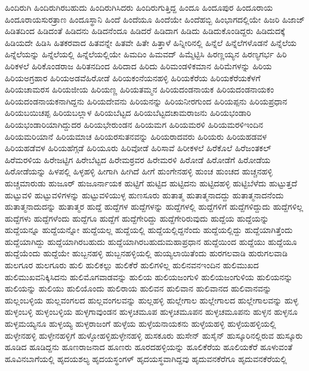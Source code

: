 {ಹಿಂದಿರುಗಿ
ಹಿಂದಿರುಗಿರಬಹುದು
ಹಿಂದಿರುಗಿಸಿದರು
ಹಿಂದಿರುಗುತ್ತಿದ್ದ
ಹಿಂದೂ
ಹಿಂದೂಪುರ
ಹಿಂದೂರಾಯ
ಹಿಂದೂರಾಯಸುರತ್ರಾಣ
ಹಿಂದೂಸ್ಥಾನಿ
ಹಿಂದೆ
ಹಿಂದೆಯೂ
ಹಿಂದೆಯೇ
ಹಿಂದೆಹಬ್ಬಿ
ಹಿಂಭಾಗದಲ್ಲಿಯೇ
ಹಿಜರಿ
ಹಿಜಾಜ್
ಹಿಡಿತದಿಂದ
ಹಿಡಿದಂತೆ
ಹಿಡಿದನು
ಹಿಡಿದನೆಂದೂ
ಹಿಡಿದರೆ
ಹಿಡಿದಾಗ
ಹಿಡಿದು
ಹಿಡಿದುಕೊಂಡಿದ್ದರು
ಹಿಡಿದುದಕ್ಕೆ
ಹಿಡಿಯದೇ
ಹಿಡಿಸಿ
ಹಿತಕರವಾದ
ಹಿತವನ್ನೇ
ಹಿತವೇ
ಹಿತೇ
ಹಿತ್ತಾಳೆ
ಹಿನ್ನೀರಿನಲ್ಲಿ
ಹಿನ್ನೆಲೆ
ಹಿನ್ನೆಲೆಗಳೊಡನೆ
ಹಿನ್ನೆಲೆಯ
ಹಿನ್ನೆಲೆಯನ್ನು
ಹಿನ್ನೆಲೆಯಲ್ಲಿ
ಹಿನ್ನೆಲೆಯಲ್ಲಿಯೇ
ಹಿಮದಿಂ
ಹಿಮವದ್
ಹಿಮ್ಮೆಟ್ಟಿಸಿ
ಹಿರಣ್ಣಯ್ಯನ
ಹಿರಣ್ಯಗರ್ಭ
ಹಿರಿ
ಹಿರಿಕಳಲೆ
ಹಿರಿಕೊಂಡರಾಜ
ಹಿರಿತನದಿಂದ
ಹಿರಿದಾದ
ಹಿರಿದು
ಹಿರಿಮಂಡಳಿಕಮಾನ
ಹಿರಿಮೆಗಳನ್ನು
ಹಿರಿಯ
ಹಿರಿಯಅಗ್ರಹಾರ
ಹಿರಿಯಅಡವೆಹಿರೋಡೆ
ಹಿರಿಯಕಂನೆಯನಹಳ್ಳಿ
ಹಿರಿಯಕೆರೆಯ
ಹಿರಿಯಕೆರೆಯಕೆಳಗೆ
ಹಿರಿಯಚಾಮರಸ
ಹಿರಿಯಜೀಯ
ಹಿರಿಯಣ್ಣ
ಹಿರಿಯತಮ್ಮನ
ಹಿರಿಯದಂಡನಾಯಕ
ಹಿರಿಯದಂಡನಾಯಕಂ
ಹಿರಿಯದಂಡನಾಯಕನಾಗಿದ್ದನು
ಹಿರಿಯದೇವನು
ಹಿರಿಯನನ್ನು
ಹಿರಿಯನೀರಗುಂದ
ಹಿರಿಯಪ್ಪನು
ಹಿರಿಯಪ್ರಧಾನ
ಹಿರಿಯಬಯಿಚಪ್ಪ
ಹಿರಿಯಬಲ್ಲಾಳ
ಹಿರಿಯಬೆಟ್ಟದ
ಹಿರಿಯಬೆಟ್ಟದಚಾಮರಾಜನು
ಹಿರಿಯಭಂಡಾರಿ
ಹಿರಿಯಭಂಡಾರಿಯಾಗಿದ್ದುದರ
ಹಿರಿಯಭೇರುಂಡನ
ಹಿರಿಯಮಗ
ಹಿರಿಯಮರಳಿ
ಹಿರಿಯಮರಳಿಇಂದಿನ
ಹಿರಿಯಮರಿಯಾನೆ
ಹಿರಿಯಮಾಚ
ಹಿರಿಯರಸುತನವನ್ನು
ಹಿರಿಯರಾದವರು
ಹಿರಿಯರು
ಹಿರಿಯಹಡವಳ
ಹಿರಿಯಹಡೆವಳ
ಹಿರಿಯಹೆಗ್ಗಡೆ
ಹಿರಿಯೂರು
ಹಿರಿವೋಡೆ
ಹಿರಿಸಾವೆ
ಹಿರೀಕಳಲೆ
ಹಿರೆಕೊಲೆ
ಹಿರೆಜಂತಕಲ್
ಹಿರೆಮರಳಿಯ
ಹಿರೇಜಟ್ಟಿಗ
ಹಿರೇಬೆಟ್ಟದ
ಹಿರೇಮಠ್ರವರ
ಹಿರೇಮರಳಿ
ಹಿರೋಡೆ
ಹಿರೋಡೆಗೆ
ಹಿರೋಡೆಯ
ಹಿರೋಡೆಯನ್ನು
ಹಿಳಪಲ್ಲಿ
ಹಿಳ್ಳಹಳ್ಳಿ
ಹೀಗಾಗಿ
ಹೀಗಿದೆ
ಹೀಗೆ
ಹುಂಗೇನಹಳ್ಳಿ
ಹುಂಚ
ಹುಂಚದ
ಹುಚ್ಚನಹಳ್ಳಿ
ಹುಚ್ಚಮಾರುಡು
ಹುಜೂರ್
ಹುಜೂರ್ನಾಯಕ
ಹುಟ್ಟಿಗೆ
ಹುಟ್ಟಿದ
ಹುಟ್ಟಿದನು
ಹುಟ್ಟಿದಹಳ್ಳಿ
ಹುಟ್ಟಿಬೆಳೆದು
ಹುಟ್ಟುತ್ತದೆ
ಹುಟ್ಟುವಳಿ
ಹುಟ್ಟುವಳಿಗಳನ್ನು
ಹುಟ್ಟುವಳಿಯುಳ್ಳ
ಹುಣಸೂರು
ಹುತಾತ್ಮ
ಹುತಾತ್ಮನಾದದ್ದು
ಹುತಾತ್ಮನಾದನೆಂದು
ಹುತಾತ್ಮನಾದುದನ್ನು
ಹುತಾತ್ಮರ
ಹುದ್ದೆ
ಹುದ್ದೆಗಳ
ಹುದ್ದೆಗಳನ್ನು
ಹುದ್ದೆಗಳಲ್ಲಿ
ಹುದ್ದೆಗಳಿಗೆ
ಹುದ್ದೆಗಳಿದ್ದುದು
ಹುದ್ದೆಗಳಿಲ್ಲ
ಹುದ್ದೆಗಳು
ಹುದ್ದೆಗಳೆಂದು
ಹುದ್ದೆಗೂ
ಹುದ್ದೆಗೆ
ಹುದ್ದೆಗೇರಿದ್ದು
ಹುದ್ದೆಗೇರಿರುವುದು
ಹುದ್ದೆಯ
ಹುದ್ದೆಯನ್ನು
ಹುದ್ದೆಯನ್ನೂ
ಹುದ್ದೆಯನ್ನೋ
ಹುದ್ದೆಯಲ್ಲ
ಹುದ್ದೆಯಲ್ಲಿ
ಹುದ್ದೆಯಲ್ಲಿದ್ದನೆಂದು
ಹುದ್ದೆಯಲ್ಲಿದ್ದು
ಹುದ್ದೆಯಾಗಿತ್ತೆಂದು
ಹುದ್ದೆಯಾಗಿದ್ದು
ಹುದ್ದೆಯಾಗಿರಬಹುದು
ಹುದ್ದೆಯಾಗಿರಬಹುದುಮಹಾಪ್ರಧಾನ
ಹುದ್ದೆಯಿಂದ
ಹುದ್ದೆಯು
ಹುದ್ದೆಯೂ
ಹುದ್ದೆಯೆಂದು
ಹುದ್ದೆಯೇ
ಹುಬ್ಬನಹಳ್ಳಿ
ಹುಬ್ಬನಹಳ್ಳಿಯಲ್ಲಿ
ಹುಯ್ಯಲಾಯಿತೆಂದು
ಹುರಗಲವಾಡಿ
ಹುರುಗಲವಾಡಿ
ಹುಲಗೂರ
ಹುಲಗೂರು
ಹುಲಿ
ಹುಲಿಕಲ್ಲು
ಹುಲಿಕೆರೆ
ಹುಲಿಗಳಿಲ್ಲ
ಹುಲಿನವನಇಂದಿನ
ಹುಲಿಮುಖದ
ಹುಲಿಮುಖವನಿಕ್ಕಿಸಿದನು
ಹುಲಿಮೊಗವಾಡವನ್ನು
ಹುಲಿಯ
ಹುಲಿಯಜಂಗುಳಿ
ಹುಲಿಯಜಂಗುಳಿಯ
ಹುಲಿಯನನ್ನು
ಹುಲಿಯನ್ನು
ಹುಲಿಯು
ಹುಲಿಯೊಂದು
ಹುಲಿರಾಯ
ಹುಲಿವನ
ಹುಲಿವಾನ
ಹುಲಿವಾನದ
ಹುಲಿವಾನವನ್ನು
ಹುಲ್ಲಂಬಳ್ಳಿಯ
ಹುಲ್ಲವಂಗಲದ
ಹುಲ್ಲವಂಗಲವನ್ನು
ಹುಲ್ಲಹಳ್ಳಿ
ಹುಲ್ಲೇಗಾಲ
ಹುಲ್ಲೇಗಾಲದ
ಹುಲ್ಲೇಗಾಲವನ್ನು
ಹುಳ್ಳ
ಹುಳ್ಳಂಬಳ್ಳಿ
ಹುಳ್ಳಂಬಳ್ಳಿಯ
ಹುಳ್ಳಗಾವುಂಡನ
ಹುಳ್ಳಚಮೂಪ
ಹುಳ್ಳಚಮೂಪನ
ಹುಳ್ಳಚಮೂಪನು
ಹುಳ್ಳನ
ಹುಳ್ಳನೂ
ಹುಳ್ಳಮಯ್ಯನೂ
ಹುಳ್ಳಯ್ಯ
ಹುಳ್ಳರಾಜಂಗೆ
ಹುಳ್ಳೆಯ
ಹುಳ್ಳೆಯನಾಯಕನು
ಹುಳ್ಳೆಯಹಳ್ಳಿ
ಹುಳ್ಳೆಯಹಳ್ಳಿಯಲ್ಲಿ
ಹುಳ್ಳೇನಹಳ್ಳಿ
ಹುಳ್ಳೇನಹಳ್ಳಿಗೆ
ಹುಳ್ಳೋಹಳ್ಳಿಹುಳ್ಳೇನಹಳ್ಳಿ
ಹುಸಕೂರು
ಹುಸೇನ್
ಹುಸೈನ್
ಹುಸ್ಕೂರಿನಲ್ಲಿರುವ
ಹುಸ್ಕೂರು
ಹೂಡಿದ
ಹೂಡಿದ್ದನು
ಹೂಣರಾಜನಾದ
ಹೂಣರು
ಹೂರದಹಳ್ಳಿಯನ್ನು
ಹೂಲಿಕೆರೆಯ
ಹೂಲಿಯಕೆರೆ
ಹೂಳುವಂತೆ
ಹೂವಿನಬಾಗೆಯಲ್ಲಿ
ಹೃದಯಶಲ್ಯ
ಹೃದಯಸ್ಥಂಗಳ್
ಹೃದಯಸ್ಥವಾಗಿದ್ದವು
ಹೃದುವನಕೆರೆಗೂ
ಹೃದುವನಕೆರೆಯಲ್ಲಿ
}
